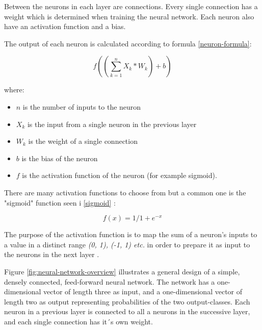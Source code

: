 \documentclass[12pt, a4paper, onecolumn]{article}
\begin{document}
	Between the neurons in each layer are connections. Every single connection has a weight which is determined when training the neural network. Each neuron also have an activation function and a bias.
	
	\newpage
	
	The output of each neuron is calculated according to formula \ref{neuron-formula}:
	
	\begin{equation}
	\label{neuron-formula}
	f((\sum_{k=1}^{n} X_{k} * W_{k}) + b)
	\end{equation}
	
	where:
	
	
	\begin{itemize}
		\item $n$ is the number of inputs to the neuron
		\item $X_{k}$ is the input from a single neuron in the previous layer
		\item $W_{k}$ is the weight of a single connection
		\item $b$ is the bias of the neuron
		\item $f$ is the activation function of the neuron (for example sigmoid).
	\end{itemize}
	
	
	There are many activation functions to choose from but a common one is the "sigmoid" function seen i \ref{sigmoid} \cite{towards-data-sci}:
	
	\begin{equation}
	\label{sigmoid}
	f(x)=1/1 + e^{-x}
	\end{equation}
	
	The purpose of the activation function is to map the sum of a neuron's inputs to a value in a distinct range \textit{(0, 1), (-1, 1) etc.} in order to prepare it as input to the neurons in the next layer \cite{towards-data-sci}. 
	
	Figure \ref{fig:neural-network-overview} illustrates a general design of a simple, densely connected, feed-forward neural network. The network has a one-dimensional vector of length three as input, and a one-dimensional vector of length two as output representing probabilities of the two output-classes. Each neuron in a previous layer is connected to all a neurons in the successive layer, and each single connection has it´s own weight. 
	
\end{document}
